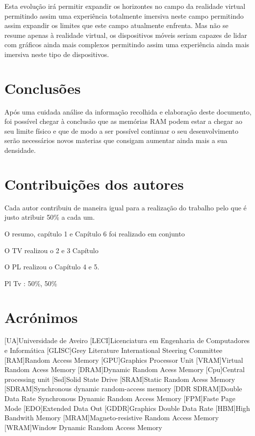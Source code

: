 \documentclass{report}
\begin{document}
\par Esta evolução irá permitir expandir os horizontes no campo da  realidade virtual permitindo assim uma experiência totalmente imersiva neste campo permitindo assim expandir os limites que este campo atualmente enfrenta. Mas não se resume apenas à realidade virtual, os dispositivos móveis seriam capazes de lidar com  gráficos ainda mais complexos permitindo assim uma experiência ainda mais imersiva neste tipo de dispositivos.

\chapter{Conclusões}
\label{chap.conclusão}
\par Após uma cuidada análise da informação recolhida e elaboração deste documento, foi possível chegar à conclusão que as memórias \ac{RAM} podem estar a chegar ao seu limite físico e que de modo a ser possível continuar o seu desenvolvimento serão necessários novos materias que consigam aumentar ainda mais a sua densidade.



\chapter*{Contribuições dos autores}
\par Cada autor contribuiu de maneira igual para a realização do trabalho pelo que é justo atribuir 50\% a cada um.
\par O resumo, capítulo 1 e Capítulo 6 foi realizado em conjunto
\par O TV realizou o 2 e 3 Capítulo
\par O PL realizou o Capítulo 4 e 5.
\vspace{10pt}


Pl Tv : 50\%, 50\%\\

\chapter*{Acrónimos}
\begin{acronym}
[UA]{Universidade de Aveiro}
[LECI]{Licenciatura em Engenharia de Computadores e Informática}
[GLISC]{Grey Literature International Steering Committee}
[RAM]{Random Access Memory}
[GPU]{Graphics Processor Unit}
[VRAM]{Virtual Random Acess Memory}
[DRAM]{Dynamic Random Acess Memory}
[Cpu]{Central processing unit}
[Ssd]{Solid State Drive}
[SRAM]{Static Random Acess Memory}
[SDRAM]{Synchronous dynamic random-access memory}
[DDR SDRAM]{Double Data Rate Synchronous Dynamic Random Access Memory}
[FPM]{Faste Page Mode}
[EDO]{Extended Data Out}
[GDDR]{Graphics Double Data Rate}
[HBM]{High Bandwith Memory}
[MRAM]{Magneto-resistive Random Access Memory}
[WRAM]{Window Dynamic Random Access Memory}
\end{acronym}


\printbibliography
\end{document}
